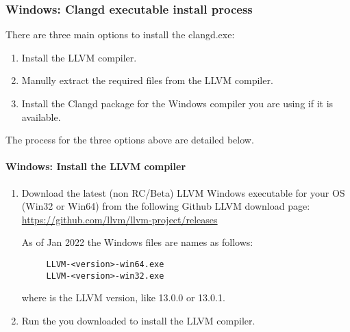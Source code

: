 \subsubsection{Windows: Clangd executable install process}\label{sec:win_install}

There are three main options to install the clangd.exe:
\begin{enumerate}[noitemsep]
\item Install the LLVM compiler.
\item Manully extract the required files from the LLVM compiler.
\item Install the Clangd package for the Windows compiler you are using if it is available.
\end{enumerate}

The  process for the three options above are detailed below.

\paragraph*{Windows: Install the LLVM compiler}\label{sec:llvm_install}

\begin{enumerate}[noitemsep]
\item Download the latest (non RC/Beta) LLVM Windows executable for your OS (Win32 or Win64) from the following Github LLVM download page: \newline
      \url{https://github.com/llvm/llvm-project/releases} \newline

  As of Jan 2022 the Windows files are names as follows:
  \begin{verbatim}
     LLVM-<version>-win64.exe
     LLVM-<version>-win32.exe
  \end{verbatim}
  where  is the LLVM version, like 13.0.0 or 13.0.1.\\

\item Run the  you downloaded to install the LLVM compiler.
\end{enumerate}

